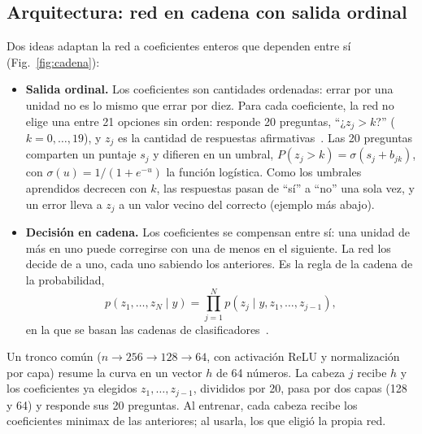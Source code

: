 \subsection{Arquitectura: red en cadena con salida ordinal}
Dos ideas adaptan la red a coeficientes enteros que dependen entre sí (Fig.~\ref{fig:cadena}):
\begin{itemize}
\item \textbf{Salida ordinal.} Los coeficientes son cantidades ordenadas: errar por una unidad no es lo mismo que errar por diez. Para cada coeficiente, la red no elige una entre 21 opciones sin orden: responde 20 preguntas, ``¿$z_j>k$?'' ($k=0,\ldots,19$), y $z_j$ es la cantidad de respuestas afirmativas~\cite{frankhall,lilin,cao}. Las 20 preguntas comparten un puntaje $s_j$ y difieren en un umbral, $P(z_j>k)=\sigma(s_j+b_{jk})$, con $\sigma(u)=1/(1+e^{-u})$ la función logística. Como los umbrales aprendidos decrecen con $k$, las respuestas pasan de ``sí'' a ``no'' una sola vez, y un error lleva a $z_j$ a un valor vecino del correcto (ejemplo más abajo).
\item \textbf{Decisión en cadena.} Los coeficientes se compensan entre sí: una unidad de más en uno puede corregirse con una de menos en el siguiente. La red los decide de a uno, cada uno sabiendo los anteriores. Es la regla de la cadena de la probabilidad,
\[
p(z_1,\ldots,z_N\mid y)=\prod_{j=1}^{N}p(z_j\mid y,z_1,\ldots,z_{j-1}),
\]
en la que se basan las cadenas de clasificadores~\cite{read11,dembczynski}.
\end{itemize}
Un tronco común ($n\to256\to128\to64$, con activación ReLU y normalización por capa) resume la curva en un vector $h$ de 64 números. La cabeza $j$ recibe $h$ y los coeficientes ya elegidos $z_1,\ldots,z_{j-1}$, divididos por 20, pasa por dos capas (128 y 64) y responde sus 20 preguntas. Al entrenar, cada cabeza recibe los coeficientes minimax de las anteriores; al usarla, los que eligió la propia red. 

